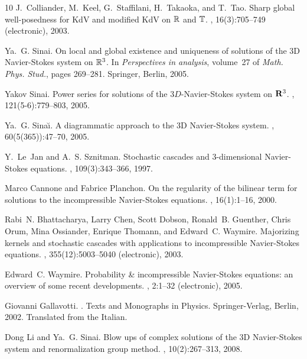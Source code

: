\documentclass[a4paper]{article}
\newcommand{\1}{{\bf 1}}
\begin{document}
\begin{thebibliography}{10}
J.~Colliander, M.~Keel, G.~Staffilani, H.~Takaoka, and T.~Tao.
\newblock Sharp global well-posedness for {K}d{V} and modified {K}d{V} on
  {$\Bbb R$} and {$\Bbb T$}.
, 16(3):705--749 (electronic), 2003.

Ya.~G. Sinai.
\newblock On local and global existence and uniqueness of solutions of the 3{D}
  {N}avier-{S}tokes system on {$\Bbb R\sp 3$}.
\newblock In {\em Perspectives in analysis}, volume~27 of {\em Math. Phys.
  Stud.}, pages 269--281. Springer, Berlin, 2005.

Yakov Sinai.
\newblock Power series for solutions of the {$3D$}-{N}avier-{S}tokes system on
  {${\bf R}\sp 3$}.
, 121(5-6):779--803, 2005.

Ya.~G. Sina{\u\i}.
\newblock A diagrammatic approach to the 3{D} {N}avier-{S}tokes system.
, 60(5(365)):47--70, 2005.

Y.~Le~Jan and A.~S. Sznitman.
\newblock Stochastic cascades and {$3$}-dimensional {N}avier-{S}tokes
  equations.
, 109(3):343--366, 1997.

Marco Cannone and Fabrice Planchon.
\newblock On the regularity of the bilinear term for solutions to the
  incompressible {N}avier-{S}tokes equations.
, 16(1):1--16, 2000.

Rabi~N. Bhattacharya, Larry Chen, Scott Dobson, Ronald~B. Guenther, Chris Orum,
  Mina Ossiander, Enrique Thomann, and Edward~C. Waymire.
\newblock Majorizing kernels and stochastic cascades with applications to
  incompressible {N}avier-{S}tokes equations.
, 355(12):5003--5040 (electronic), 2003.

Edward~C. Waymire.
\newblock Probability \& incompressible {N}avier-{S}tokes equations: an
  overview of some recent developments.
, 2:1--32 (electronic), 2005.

Giovanni Gallavotti.
.
\newblock Texts and Monographs in Physics. Springer-Verlag, Berlin, 2002.
\newblock Translated from the Italian.

Dong Li and Ya.~G. Sinai.
\newblock Blow ups of complex solutions of the 3{D} {N}avier-{S}tokes system
  and renormalization group method.
, 10(2):267--313, 2008.

\end{thebibliography}
\end{document}
